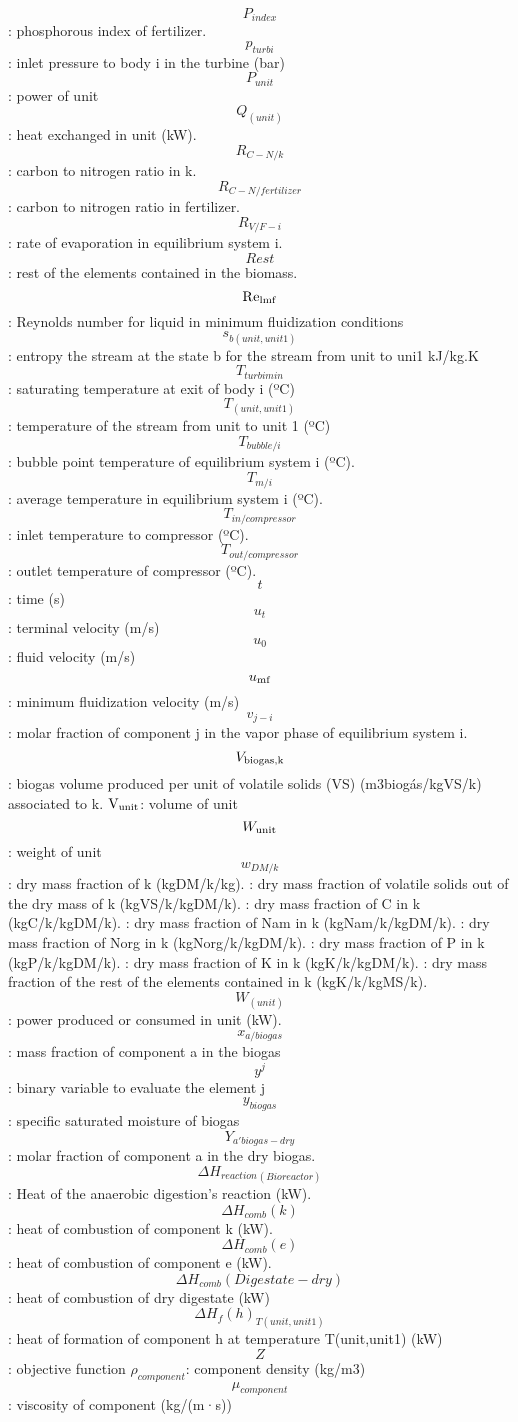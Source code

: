 \documentclass[10pt,a4paper]{article}
\begin{document}
\[{P_{index}}\]: phosphorous index of fertilizer.
\[{p_{turbi}}\]: inlet pressure to body i in the turbine (bar) 
\[{P_{unit}}\]: power of unit
\[{Q_{(unit)}}\]: heat exchanged in unit (kW).
\[{R_{C - N/k}}\]: carbon to nitrogen ratio in k.
\[{R_{C - N/fertilizer}}\]: carbon to nitrogen ratio in fertilizer.
\[{R_{V/F - i}}\]: rate of evaporation in equilibrium system i.
\[Rest\]: rest of the elements contained in the biomass.
\[{\rm{R}}{{\rm{e}}_{{\rm{l mf}}}}\]: Reynolds number for liquid in minimum fluidization conditions
\[{s_{b(unit,unit1)}}\]: entropy the stream at the state b for the stream from unit to uni1 kJ/kg.K
\[{T_{turbimin}}\]: saturating temperature at exit of body i (ºC)
\[{T_{(unit,unit1)}}\]: temperature of the stream from unit to unit 1 (ºC)
\[{T_{bubble/i}}\]: bubble point temperature of equilibrium system i (ºC).
\[{T_{m/i}}\]: average temperature in equilibrium system i (ºC).
\[{T_{in/compressor}}\]: inlet temperature to compressor (ºC).
\[{T_{out/compressor}}\]: outlet temperature of compressor (ºC).
\[t\]: time (s)
\[{u_t}\]: terminal velocity (m/s)
\[{u_0}\]: fluid velocity (m/s)
\[{u_{{\rm{mf}}}}\]: minimum fluidization velocity (m/s)
\[{v_{j - i}}\]: molar fraction of component j in the vapor phase of equilibrium system i.
\[{V_{{\rm{biogas, k}}}}\]: biogas volume produced per unit of volatile solids (VS) (m3biogás/kgVS/k) associated to k.  
\({{\rm{V}}_{{\rm{unit}}}}\): volume of unit 
\[{W_{{\rm{unit}}}}\]: weight of unit
\[{w_{DM/k}}\]: dry mass fraction of k (kgDM/k/kg).
: dry mass fraction of volatile solids out of the dry mass of k (kgVS/k/kgDM/k).
: dry mass fraction of C in k (kgC/k/kgDM/k).
: dry mass fraction of Nam in k (kgNam/k/kgDM/k).
: dry mass fraction of Norg in k (kgNorg/k/kgDM/k).
: dry mass fraction of P in k (kgP/k/kgDM/k).
: dry mass fraction of K in k (kgK/k/kgDM/k).
: dry mass fraction of the rest of the elements contained in k (kgK/k/kgMS/k).
\[{W_{(unit)}}\]: power produced or consumed in unit (kW).
\[{x_{a/biogas}}\]: mass fraction of component a in the biogas
\[{y^j}\]: binary variable to evaluate the element j
\[{y_{biogas}}\]: specific saturated moisture of biogas
\[{Y_{a' biogas-dry}}\]: molar fraction of component a in the dry biogas.
\[\Delta {H_{reaction}}{_{(Bioreactor)}}\]: Heat of the anaerobic digestion’s reaction (kW).
\[\Delta {H_{comb}}\left( k \right)\]: heat of combustion of component k (kW).
\[\Delta {H_{comb}}\left( e \right)\]: heat of combustion of component e (kW).
\[\Delta {H_{comb}}\left( {Digestate - dry} \right)\]: heat of combustion of dry digestate (kW)
\[\Delta {H_f}{\left( h \right)_{T(unit,unit1)}}\]: heat of formation of component h at temperature T(unit,unit1) (kW)
\[Z\]: objective function
\({\rho _{component}}\): component density (kg/m3)
\[{\mu _{component}}\]: viscosity of component (kg/(m·s))
\end{document}
